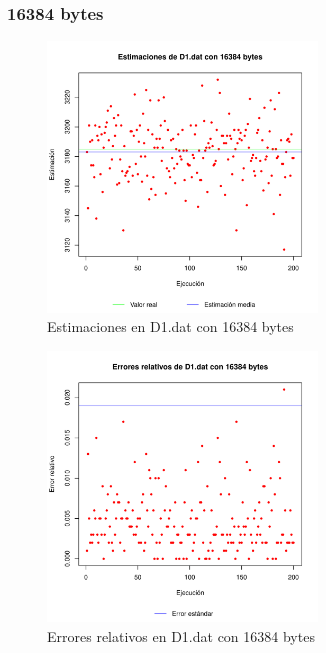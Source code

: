 \subsubsection{16384 bytes}
\begin{figure}[h!]
    \centering
        \includegraphics[width=0.64\textwidth]{../figs/D1/plot_estimation_16384.pdf}
        \caption{Estimaciones en D1.dat con 16384 bytes}
    \label{figura:D1_estimation_16384}
\end{figure}

\begin{figure}[h!]
    \centering
        \includegraphics[width=0.64\textwidth]{../figs/D1/plot_errors_16384.pdf}
        \caption{Errores relativos en D1.dat con 16384 bytes}
    \label{figura:D1_errors_16384}
\end{figure}

